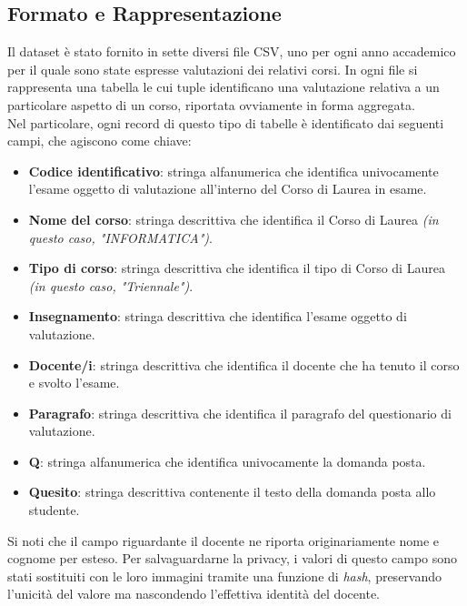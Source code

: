 \subsection{Formato e Rappresentazione}

Il dataset è stato fornito in sette diversi file CSV, uno per ogni anno accademico per il quale sono state espresse valutazioni dei relativi corsi. In ogni file si rappresenta una tabella le cui tuple identificano una valutazione relativa a un particolare aspetto di un corso, riportata ovviamente in forma aggregata. \\

\noindent Nel particolare, ogni record di questo tipo di tabelle è identificato dai seguenti campi, che agiscono come chiave:

\begin{itemize}
	\item \textbf{Codice identificativo}: stringa alfanumerica che identifica univocamente l'esame oggetto di valutazione all'interno del Corso di Laurea in esame.
	\item \textbf{Nome del corso}: stringa descrittiva che identifica il Corso di Laurea \textit{(in questo caso, "INFORMATICA")}.
	\item \textbf{Tipo di corso}: stringa descrittiva che identifica il tipo di Corso di Laurea \textit{(in questo caso, "Triennale")}.
	\item \textbf{Insegnamento}: stringa descrittiva che identifica l'esame oggetto di valutazione.
	\item \textbf{Docente/i}: stringa descrittiva che identifica il docente che ha tenuto il corso e svolto l'esame.
	\item \textbf{Paragrafo}: stringa descrittiva che identifica il paragrafo del questionario di valutazione.
	\item \textbf{Q}: stringa alfanumerica che identifica univocamente la domanda posta.
	\item \textbf{Quesito}: stringa descrittiva contenente il testo della domanda posta allo studente.
\end{itemize}

\noindent  Si noti che il campo riguardante il docente ne riporta originariamente nome e cognome per esteso. Per salvaguardarne la privacy, i valori di questo campo sono stati sostituiti con le loro immagini tramite una funzione di \textit{hash}, preservando l'unicità del valore ma nascondendo l'effettiva identità del docente. \\

